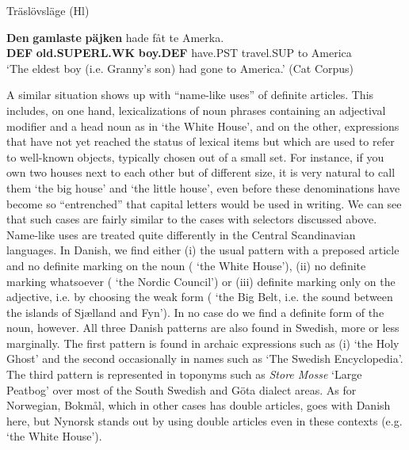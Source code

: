 \item 

Träslövsläge (Hl)



 \ea\label{}
\gll \textbf{Den}\textbf{  gamlaste}\textbf{  päjken} hade  fåt  te  Amerka.\\


\textbf{DEF} \textbf{old.SUPERL.WK} \textbf{boy.DEF} have.PST  travel.SUP  to  America\\

\glt ‘The eldest boy (i.e. Granny’s son) had gone to America.’ (Cat Corpus)

\z

A similar situation shows up with “name-like uses” of definite articles. This includes, on one hand, lexicalizations of noun phrases containing an adjectival modifier and a head noun as in  ‘the White House’, and on the other, expressions that have not yet reached the status of lexical items but which are used to refer to well-known objects, typically chosen out of a small set. For instance, if you own two houses next to each other but of different size, it is very natural to call them  ‘the big house’ and  ‘the little house’, even before these denominations have become so “entrenched” that capital letters would be used in writing. We can see that such cases are fairly similar to the cases with selectors discussed above. Name-like uses are treated quite differently in the Central Scandinavian languages. In Danish, we find either (i) the usual pattern with a preposed article and no definite marking on the noun ( ‘the White House’), (ii) no definite marking whatsoever ( ‘the Nordic Council’) or (iii) definite marking only on the adjective, i.e. by choosing the weak form ( ‘the Big Belt, i.e. the sound between the islands of Sjælland and Fyn’). In no case do we find a definite form of the noun, however. All three Danish patterns are also found in Swedish, more or less marginally. The first pattern is found in archaic expressions such as (i)  ‘the Holy Ghost’ and the second occasionally in names such as   ‘The Swedish Encyclopedia’. The third pattern is represented in toponyms such as \textit{Store Mosse} ‘Large Peatbog’ over most of the South Swedish and Göta dialect areas. As for Norwegian, Bokmål, which in other cases has double articles, goes with Danish here, but Nynorsk stands out by using double articles even in these contexts (e.g.  ‘the White House’). 

